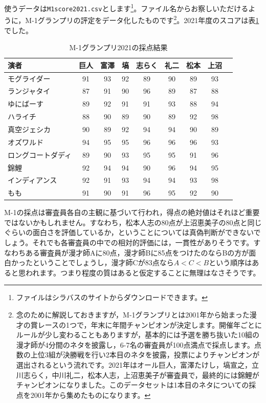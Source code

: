 \documentclass{ltjsbook}
\begin{document}
使うデータは\verb|M1score2021.csv|とします\footnote{ファイルはシラバスのサイトからダウンロードできます。}。ファイル名からお察しいただけるように，M-1グランプリの評定をデータ化したものです\footnote{念のために解説しておきますが，M-1グランプリとは2001年から始まった漫才の賞レースの1つで，年末に年間チャンピオンが決定します。開催年ごとにルールが少し変わることもありますが，基本的には予選を勝ち抜いた10組の漫才師が4分間のネタを披露し，6-7名の審査員が100点満点で採点します。点数の上位3組が決勝戦を行い2本目のネタを披露，投票によりチャンピオンが選出されるという流れです。2021年はオール巨人，富澤たけし，塙宣之，立川志らく，中川礼二，松本人志，上沼恵美子が審査員で，最終的には錦鯉がチャンピオンになりました。このデータセットは1本目のネタについての採点を2001年から集めたものになります。}。2021年度のスコアは表\ref{tbl:x15_m1}でした。

\begin{table}[ht]
	\centering
	\caption{M-1グランプリ2021の採点結果}
	\begin{tabular}{l|cccccccc}
		\hline
		演者        & 巨人 & 富澤 & 塙  & 志らく & 礼二 & 松本 & 上沼 \\
		\hline
		モグライダー    & 91 & 93 & 92 & 89  & 90 & 89 & 93 \\
		ランジャタイ    & 87 & 91 & 90 & 96  & 89 & 87 & 88 \\
		ゆにばーす     & 89 & 92 & 91 & 91  & 93 & 88 & 94 \\
		ハライチ      & 88 & 90 & 89 & 90  & 89 & 92 & 98 \\
		真空ジェシカ    & 90 & 89 & 92 & 94  & 94 & 90 & 89 \\
		オズワルド     & 94 & 95 & 95 & 96  & 96 & 96 & 93 \\
		ロングコートダディ & 89 & 90 & 93 & 95  & 95 & 91 & 96 \\
		錦鯉        & 92 & 94 & 94 & 90  & 96 & 94 & 95 \\
		インディアンス   & 92 & 91 & 93 & 94  & 94 & 93 & 98 \\
		もも        & 91 & 90 & 91 & 96  & 95 & 92 & 90 \\
		\hline
	\end{tabular}
	\label{tbl:x15_m1}
\end{table}


M-1の採点は審査員各自の主観に基づいて行われ，得点の絶対値はそれほど重要ではないかもしれません。すなわち，松本人志の80点が上沼恵美子の80点と同じぐらいの面白さを評価しているか，ということについては真偽判断ができないでしょう。それでも各審査員の中での相対的評価には，一貫性がありそうです。すなわちある審査員が漫才師Aに80点，漫才師Bに85点をつけたのならBの方が面白かったということでしょうし，漫才師Cが83点なら$A<C<B$という順序はあると思われます。つまり程度の質はあると仮定することに無理はなさそうです。
\end{document}
